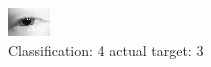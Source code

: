 \begin{figure}[h!]
\begin{center}
\includegraphics[width=0.60\columnwidth]{figures/ID151_class_4_target_3.png}
\end{center}
\caption{ Classification: 4 actual target: 3}
\label{fig:ID151_class_4_target_3}
\end{figure}
